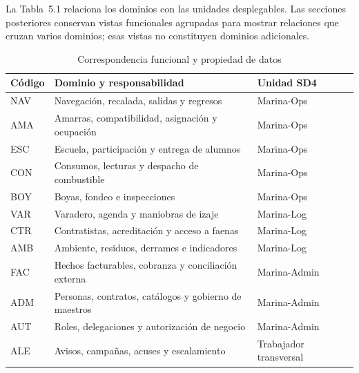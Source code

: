 La Tabla~5.1 relaciona los dominios con las unidades desplegables. Las secciones posteriores conservan vistas funcionales agrupadas para mostrar relaciones que cruzan varios dominios; esas vistas no constituyen dominios adicionales.

\begingroup
\setlength{\tabcolsep}{3pt}

\begin{longtable}{@{}
    L{.34\textwidth}
    L{.33\textwidth}
    L{\dimexpr.33\textwidth-12pt\relax}
@{}}
    \caption{Correspondencia funcional y propiedad de datos}
    \label{tab:sd5_correspondencia_dominios}\\ \hline
    Código & Dominio y responsabilidad & Unidad SD4 \\
\hline
 NAV & Navegación, recalada, salidas y regresos & Marina-Ops \\
 AMA & Amarras, compatibilidad, asignación y ocupación & Marina-Ops \\
 ESC & Escuela, participación y entrega de alumnos & Marina-Ops \\
 CON & Consumos, lecturas y despacho de combustible & Marina-Ops \\
 BOY & Boyas, fondeo e inspecciones & Marina-Ops \\
 VAR & Varadero, agenda y maniobras de izaje & Marina-Log \\
 CTR & Contratistas, acreditación y acceso a faenas & Marina-Log \\
 AMB & Ambiente, residuos, derrames e indicadores & Marina-Log \\
 FAC & Hechos facturables, cobranza y conciliación externa & Marina-Admin \\
 ADM & Personas, contratos, catálogos y gobierno de maestros & Marina-Admin \\
 AUT & Roles, delegaciones y autorización de negocio & Marina-Admin \\
 ALE & Avisos, campañas, acuses y escalamiento & Trabajador transversal \
\end{longtable}
\endgroup

